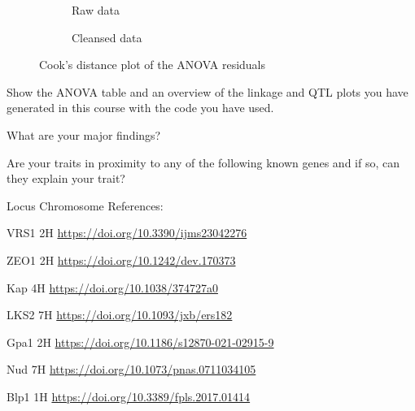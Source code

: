 \begin{figure}[htbp]
    \begin{subfigure}[t]{.48\textwidth}
        
        \caption{Raw data}
        \label{fig:raw_aov_height_residuals_cooks_dist}
    \end{subfigure}
    \begin{subfigure}[t]{.48\textwidth}
        
        \caption{Cleansed data}
        \label{fig:clean_aov_height_residuals_cooks_dist}
    \end{subfigure}
    \caption{Cook's distance plot of the ANOVA residuals}
    \label{fig:aov_height_residuals_cooks_dist}
\end{figure}



Show the ANOVA table and an overview of the linkage and QTL plots you have generated in this course with the code you have used.

What are your major findings?

Are your traits in proximity to any of the following known genes and if so, can they explain your trait?

Locus Chromosome References:

VRS1 2H \url{https://doi.org/10.3390/ijms23042276}

ZEO1 2H \url{https://doi.org/10.1242/dev.170373}

Kap 4H \url{https://doi.org/10.1038/374727a0}

LKS2 7H \url{https://doi.org/10.1093/jxb/ers182}

Gpa1 2H \url{https://doi.org/10.1186/s12870-021-02915-9}

Nud 7H \url{https://doi.org/10.1073/pnas.0711034105}

Blp1 1H \url{https://doi.org/10.3389/fpls.2017.01414}
